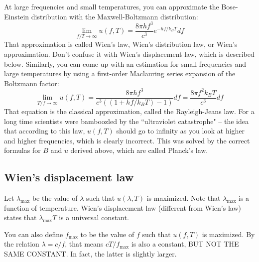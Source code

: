 \documentclass[12pt]{article}
\begin{document}
At large frequencies and small temperatures, you can approximate the Bose-Einstein distribution with the Maxwell-Boltzmann distribution:
\[ \lim_{f/T \rightarrow \infty} u(f, T) = \frac{8 \pi h f^3}{c^3} e^{-hf/k_B T} df \]
That approximation is called Wien's law, Wien's distribution law, or Wien's approximation. Don't confuse it with Wien's displacement law, which is described below. Similarly, you can come up with an estimation for small frequencies and large temperatures by using a first-order Maclauring series expansion of the Boltzmann factor:
\[ \lim_{T/f \rightarrow \infty} u(f, T) = \frac{8 \pi h f^3}{c^3 ((1 + hf/k_B T) - 1)} df  = \frac{8 \pi f^2 k_B T}{c^3} df \]
That equation is the classical approximation, called the Rayleigh-Jeans law. For a long time scientists were bamboozled by the ``ultraviolet catastrophe" -- the idea that according to this law, $u(f, T)$ should go to infinity as you look at higher and higher frequencies, which is clearly incorrect. This was solved by the correct formulas for $B$ and $u$ derived above, which are called Planck's law.

\subsection{Wien's displacement law}
Let $\lambda_{\text{max}}$ be the value of $\lambda$ such that $u(\lambda, T)$ is maximized. Note that $\lambda_\text{max}$ is a function of temperature. Wien's displacement law (different from Wien's law) states that $\lambda_\text{max} T$ is a universal constant.

You can also define $f_\text{max}$ to be the value of $f$ such that $u(f, T)$ is maximized. By the relation $\lambda = c / f$, that means $c T / f_\text{max}$ is also a constant, BUT NOT THE SAME CONSTANT. In fact, the latter is slightly larger.
\end{document}
